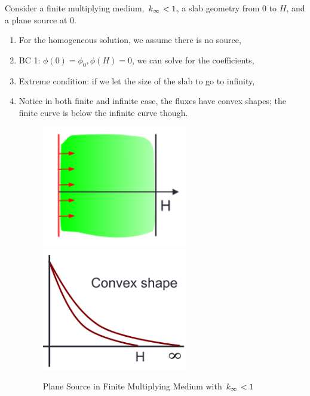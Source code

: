 \documentclass{school-22.211-notes}
\begin{document}
\clearpage
{}
Consider a finite multiplying medium, $\left. k_{\infty} \right. < 1$, a slab geometry from $0$ to $H$, and a plane source at $0$.  
\begin{enumerate}
\item For the homogeneous solution, we assume there is no source, 

\item BC 1: $\displaystyle \phi(0) = \phi_0, \phi(H) = 0$, we can solve for the coefficients, 

\item Extreme condition: if we let the size of the slab to go to infinity, 



\item Notice in both finite and infinite case, the fluxes have convex shapes; the finite curve is below the infinite curve though. 
\begin{figure}[ht]
  \centering
  \includegraphics[width=2.5in]{images/dfs/plane-multiplying-geo.png}
  \includegraphics[width=2.5in]{images/dfs/plane-multiplying-phi.png}
  \caption{Plane Source in Finite Multiplying Medium with $\left. k_{\infty} \right. < 1$}
\end{figure}
\end{enumerate}
\end{document}
